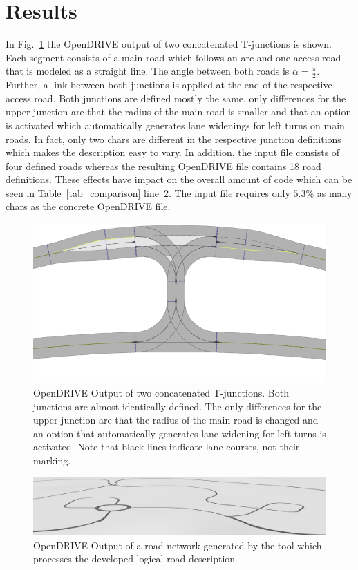 \documentclass[a4paper, 10pt, conference]{ieeeconf}      %
\begin{document}
\section{Results}
In Fig.~\ref{fig_res3_2} the OpenDRIVE output of two concatenated T-junctions is shown. Each segment consists of a main road which follows an arc and one access road that is modeled as a straight line. The angle between both roads is $\alpha=\frac{\pi}{2}$. Further, a link between both junctions is applied at the end of the respective access road. Both junctions are defined mostly the same, only differences for the upper junction are that the radius of the main road is smaller and that an option is activated which automatically generates lane widenings for left turns on main roads. In fact, only two chars are different in the respective junction definitions which makes the description easy to vary. In addition, the input file consists of four defined roads whereas the resulting OpenDRIVE file contains 18 road definitions. These effects have impact on the overall amount of code which can be seen in Table~\ref{tab_comparison} line~2. The input file requires only $5.3\%$ as many chars as the concrete OpenDRIVE file.
\begin{figure}[thpb]
	\includegraphics[width=\columnwidth]{fig/res3_2.png}
	\caption{OpenDRIVE Output of two concatenated T-junctions. Both junctions are almost identically defined. The only differences for the upper junction are that the radius of the main road is changed and an option that automatically generates lane widening for left turns is activated. Note that black lines indicate lane courses, not their marking.}
	\label{fig_res3_2}
\end{figure}
\begin{figure}[ht]
\includegraphics[width=\textwidth]{fig/res_huge.PNG}
\caption{OpenDRIVE Output of a road network generated by the tool which processes the developed logical road description}
\label{fig_resHuge}
\end{figure} %
\end{document}
